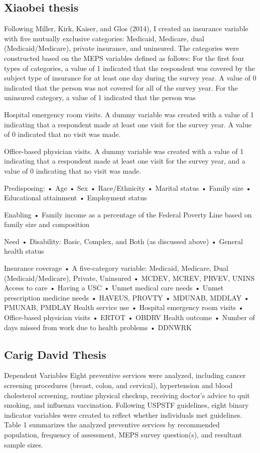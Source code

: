 \documentclass[../main.tex]{subfiles}
\begin{document}
\subsection{Xiaobei thesis }
Following Miller, Kirk, Kaiser, and Glos (2014), I created an insurance variable with five mutually exclusive categories: Medicaid, Medicare, dual (Medicaid/Medicare), private insurance, and uninsured. The categories were constructed based on the MEPS variables defined as follows: For the first four types of categories, a value of 1 indicated that the respondent was covered by the subject type of insurance for at least one day during the survey year. A value of 0 indicated that the person was not covered for all of the survey year. For the uninsured category, a value of 1 indicated that the person was

Hospital emergency room visits. A dummy variable was created with a value of 1 indicating that a respondent made at least one visit for the survey year. A value of 0 indicated that no visit was made.

Office-based physician visits. A dummy variable was created with a value of 1 indicating that a respondent made at least one visit for the survey year, and a value of 0 indicating that no visit was made.

Predisposing: • Age • Sex • Race/Ethnicity • Marital status • Family size • Educational attainment • Employment status

Enabling • Family income as a percentage of the Federal Poverty Line based on family size and composition

Need • Disability: Basic, Complex, and Both (as discussed above) • General health status

Insurance coverage • A five-category variable: Medicaid, Medicare, Dual (Medicaid/Medicare), Private, Uninsured • MCDEV, MCREV, PRVEV, UNINS Access to care • Having a USC • Unmet medical care needs • Unmet prescription medicine needs • HAVEUS, PROVTY • MDUNAB, MDDLAY • PMUNAB, PMDLAY Health service use • Hospital emergency room visits • Office-based physician visits • ERTOT • OBDRV Health outcome • Number of days missed from work due to health problems • DDNWRK



\subsection{Carig David Thesis}

Dependent Variables 
Eight preventive services were analyzed, including cancer screening procedures (breast, colon, and cervical), hypertension and blood cholesterol screening, routine physical checkup, receiving doctor’s advice to quit smoking, and influenza vaccination. Following USPSTF guidelines, eight binary indicator variables were created to reflect whether individuals met guidelines. Table 1 summarizes the analyzed preventive services by recommended population, frequency of assessment, MEPS survey question(s), and resultant sample sizes.
\end{document}
